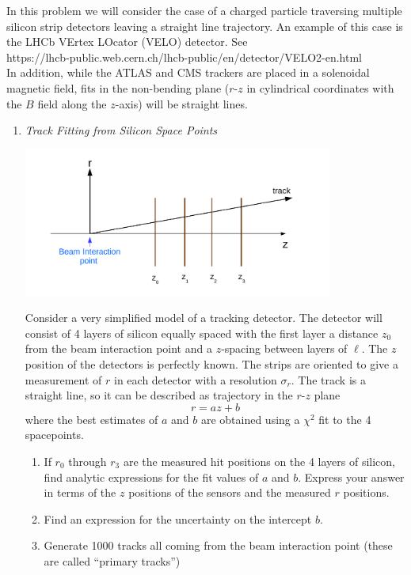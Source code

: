 \documentclass[12pt]{article}
\begin{document}
In this problem
we will consider the case of a charged particle traversing multiple silicon
  strip detectors leaving a straight line trajectory.  An example
  of this case is the LHCb VErtex LOcator (VELO) detector.  See\\
  https://lhcb-public.web.cern.ch/lhcb-public/en/detector/VELO2-en.html\\
  In addition, while the ATLAS and CMS trackers are placed in a solenoidal
  magnetic field, fits in the non-bending plane ($r$-$z$ in cylindrical
  coordinates with the $B$ field along the $z$-axis) will be straight lines.
\newpage
\begin{enumerate}
\item {\it Track Fitting from Silicon Space Points}
\begin{center}
  \includegraphics[width=4.0in]{tracker.png}
\end{center}  Consider a very simplified model of a tracking
  detector.  The detector will consist of 4 layers of silicon equally spaced
  with the first layer a distance $z_0$ from the beam interaction point and a
  $z$-spacing  between layers of $\ell$.
  The $z$ position of the detectors is perfectly
  known.  The strips are oriented to give a measurement of $r$ in each detector
  with a resolution $\sigma_r$.
  The track is a straight line, so it can be described as
  trajectory in the $r$-$z$ plane
  $$
    r = az + b 
  $$
  where the best estimates of $a$ and $b$ are obtained using a $\chi^2$ fit
  to the 4 spacepoints.
  \begin{enumerate}
  \item If $r_0$ through $r_3$ are the measured hit positions on
    the 4 layers of silicon, find analytic expressions for the fit
    values of $a$ and $b$. Express your answer in terms of the $z$ positions
    of the sensors and the measured $r$ positions.  
  \item Find an expression for the uncertainty on the intercept $b$.
  \item Generate 1000 tracks all coming from the
    beam interaction point (these are called ``primary tracks'')

\end{enumerate}
\end{enumerate}
\end{document}
